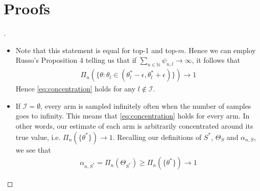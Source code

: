 \section{Proofs}\label{section:txts_proofs}
\begin{proof}[]

  \begin{itemize}
  \item Note that this statement is equal for top-1 and top-$m$. Hence we can
  employ Russo's Proposition 4 telling us that if $\sum_{n \in \mathbb{N}}
  \psi_{n, l} \rightarrow \infty$, it follows that
  \begin{align}
    \Pi_n(\{\theta: \theta_l \in (\theta^*_l - \epsilon, \theta^*_l +
        \epsilon)\}) \rightarrow 1 \label{eq:concentration}
  \end{align}
  Hence \eqref{eq:concentration} holds for any $l \notin \mathcal{I}$. \item If
  $\mathcal{I} = \emptyset$, every arm is sampled infinitely often when the
  number of samples goes to infinity. This means that \eqref{eq:concentration}
  holds for every arm. In other words, our estimate of each arm is arbitrarily
  concentrated around its true value, i.e. $\Pi_n(\{\theta^*\}) \rightarrow 1$.
  Recalling our definitions of $S^*$, $\Theta_S$ and $\alpha_{n, S}$, we see
  that
  \begin{align}
    \alpha_{n, S^*} = \Pi_n(\Theta_{S^*}) \geq \Pi_n(\{\theta^*\}) \rightarrow 1
  \end{align}


\end{itemize}
\end{proof}
